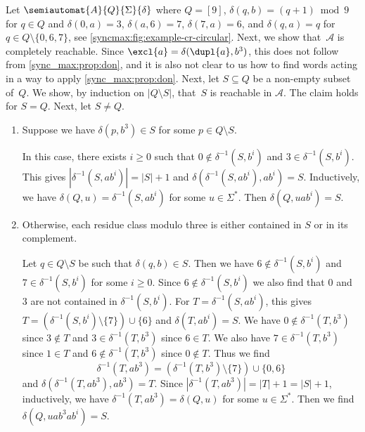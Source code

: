 \begin{example} \label{syncmax:ex:circular-compl-reach-two}
	Let $\semiautomat{A}{Q}{\Sigma}{\delta}$
	where $Q = [9]$, $\delta(q, b) = (q + 1) \bmod 9$ for $q \in Q$
	and $\delta(0, a) = 3$, $\delta(a, 6) = 7$, $\delta(7, a) = 6$,
	and $\delta(q, a) = q$ for $q \in Q \setminus\{0,6,7\}$, see \cref{syncmax:fig:example-cr-circular}.
	Next, we show that~$\mathcal A$ is completely reachable.
	Since $\excl{a} = \delta(\dupl{a}, b^3)$,
	this does not follow from \cref{sync_max:prop:don},
	and it is also not clear to us how to find words
	acting in a way to apply \cref{sync_max:prop:don}.
	Next, let $S \subseteq Q$ be a non-empty subset of~$Q$.
	We show, by induction on $|Q \setminus S|$,
	that~$S$ is reachable in $\mathcal A$.
	The claim holds for $S = Q$.
	Next, let $S \ne Q$.	
	
	\begin{enumerate}
	\item Suppose we have $\delta(p, b^3) \in S$ for some $p \in Q \setminus S$.
	
	In this case, there exists $i \ge 0$ such that
	$0 \notin \delta^{-1}(S, b^i)$ and $3 \in \delta^{-1}(S, b^i)$.
	This gives $|\delta^{-1}(S, ab^i)| = |S| + 1$
	and $\delta( \delta^{-1}(S, ab^i), ab^i ) = S$.
	Inductively, we have $\delta(Q, u) = \delta^{-1}(S, ab^i)$
	for some $u \in \Sigma^*$.
	Then $\delta(Q, uab^i) = S$.	
	
	\item Otherwise, each residue class modulo three is either contained in $S$ or in its complement.
		
	Let $q \in Q \setminus S$ be such that $\delta(q, b) \in S$.
	Then we have $6 \notin \delta^{-1}(S, b^i)$ and $7 \in \delta^{-1}(S, b^i)$
	for some $i \ge 0$. 
	Since $6 \notin \delta^{-1}(S, b^i)$
	we also find that $0$ and $3$ are not contained in $\delta^{-1}(S, b^i)$.
	For $T = \delta^{-1}(S, ab^i)$,
	this gives $T = ( \delta^{-1}(S, b^i) \setminus \{ 7  \} ) \cup \{ 6\}$
	and $\delta(T, ab^i) = S$.
	We have $0 \notin \delta^{-1}(T, b^3)$
	since $3 \notin T$ and $3 \in \delta^{-1}(T, b^3)$
	since $6 \in T$.
	We also have $7 \in \delta^{-1}(T, b^3)$ since $1 \in T$
	and $6 \notin \delta^{-1}(T, b^3)$ since $0 \notin T$.
	Thus we find
	\[
	\delta^{-1}(T, ab^3) = ( \delta^{-1}(T, b^3) \setminus \{ 7 \} ) \cup \{ 0,6 \}
	\]
	and $\delta(\delta^{-1}(T, ab^3), ab^3) = T$.
	Since $|\delta^{-1}(T, ab^3)| = |T| + 1 = |S| + 1$, inductively,
	we have $\delta^{-1}(T, ab^3) = \delta(Q, u)$ for some $u \in \Sigma^*$.
	Then we find $\delta(Q, uab^3ab^i) = S$.	
	\end{enumerate}
	

\end{example}
